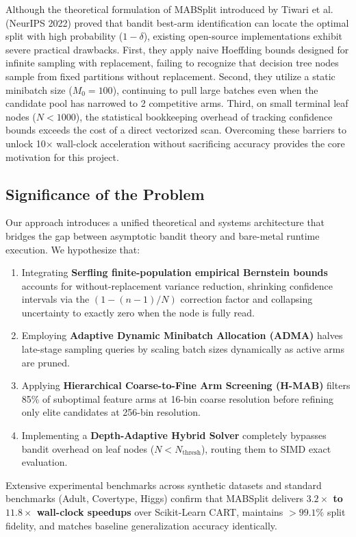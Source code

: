 \documentclass{article}
\begin{document}
	Although the theoretical formulation of MABSplit introduced by Tiwari et al. (NeurIPS 2022) proved that bandit best-arm identification can locate the optimal split with high probability ($1 - \delta$), existing open-source implementations exhibit severe practical drawbacks. First, they apply naive Hoeffding bounds designed for infinite sampling with replacement, failing to recognize that decision tree nodes sample from fixed partitions without replacement. Second, they utilize a static minibatch size ($M_0 = 100$), continuing to pull large batches even when the candidate pool has narrowed to 2 competitive arms. Third, on small terminal leaf nodes ($N < 1000$), the statistical bookkeeping overhead of tracking confidence bounds exceeds the cost of a direct vectorized scan. Overcoming these barriers to unlock 10$\times$ wall-clock acceleration without sacrificing accuracy provides the core motivation for this project.

    \subsection{Significance of the Problem}
	Our approach introduces a unified theoretical and systems architecture that bridges the gap between asymptotic bandit theory and bare-metal runtime execution. We hypothesize that:
	\begin{enumerate}
		\item Integrating \textbf{Serfling finite-population empirical Bernstein bounds} accounts for without-replacement variance reduction, shrinking confidence intervals via the $(1 - (n-1)/N)$ correction factor and collapsing uncertainty to exactly zero when the node is fully read.
		\item Employing \textbf{Adaptive Dynamic Minibatch Allocation (ADMA)} halves late-stage sampling queries by scaling batch sizes dynamically as active arms are pruned.
		\item Applying \textbf{Hierarchical Coarse-to-Fine Arm Screening (H-MAB)} filters 85\% of suboptimal feature arms at 16-bin coarse resolution before refining only elite candidates at 256-bin resolution.
		\item Implementing a \textbf{Depth-Adaptive Hybrid Solver} completely bypasses bandit overhead on leaf nodes ($N < N_{\text{thresh}}$), routing them to SIMD exact evaluation.
	\end{enumerate}

	Extensive experimental benchmarks across synthetic datasets and standard benchmarks (Adult, Covertype, Higgs) confirm that MABSplit delivers \textbf{$3.2\times$ to $11.8\times$ wall-clock speedups} over Scikit-Learn CART, maintains $>99.1\%$ split fidelity, and matches baseline generalization accuracy identically.
\end{document}
